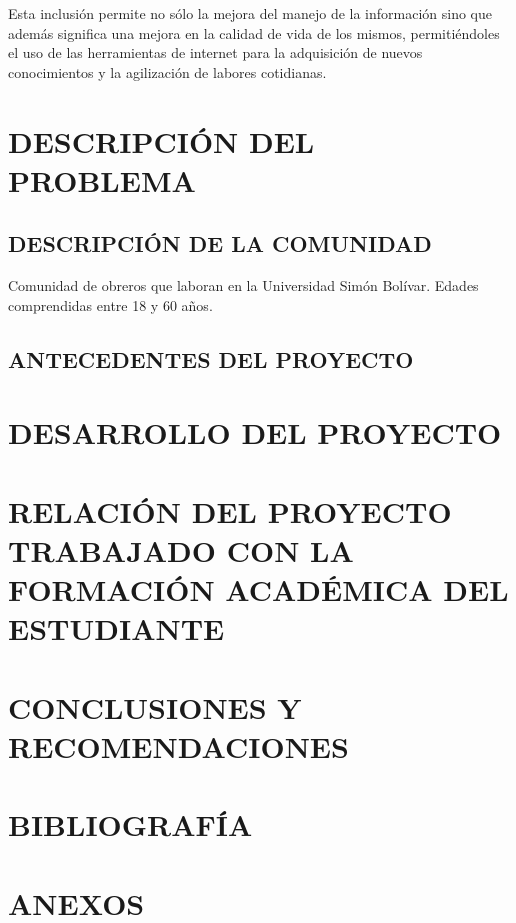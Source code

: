 \documentclass[letterpaper,12pt]{article}
\begin{document}
        Esta inclusión permite no sólo la mejora del manejo de la información sino que además significa una mejora en la calidad de vida de los mismos, permitiéndoles el uso de las herramientas de internet para la adquisición de nuevos conocimientos y la agilización de labores cotidianas.
	\pagebreak
	
	\section{DESCRIPCIÓN DEL PROBLEMA}
		\subsection{DESCRIPCIÓN DE LA COMUNIDAD}
			Comunidad de obreros que laboran en la Universidad Simón Bolívar. Edades
			comprendidas entre 18 y 60 años.
		\subsection{ANTECEDENTES DEL PROYECTO}
	\pagebreak
	
	\section{DESARROLLO DEL PROYECTO}
	\pagebreak
	
	\section{RELACIÓN DEL PROYECTO TRABAJADO CON LA FORMACIÓN ACADÉMICA	DEL ESTUDIANTE}
	\pagebreak
	
	\section{CONCLUSIONES Y RECOMENDACIONES}
	\pagebreak
	
	\section{BIBLIOGRAFÍA}
	\pagebreak
	
	\section{ANEXOS}
\end{document}
